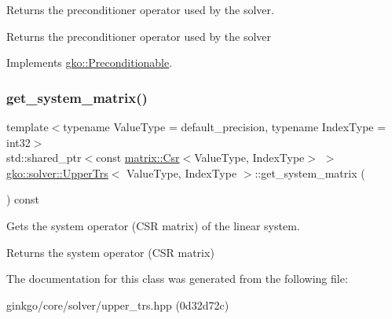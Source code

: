 Returns the preconditioner operator used by the solver. 

\begin{DoxyReturn}{Returns}
the preconditioner operator used by the solver 
\end{DoxyReturn}


Implements \hyperlink{classgko_1_1Preconditionable_ad9545089aef0dfc83bc7a74e5bf1d748}{gko\+::\+Preconditionable}.

\mbox{\label{classgko_1_1solver_1_1UpperTrs_a5634d236ea80f6e0ad0bb80aae965a78}} 
\subsubsection{\texorpdfstring{get\+\_\+system\+\_\+matrix()}{get\_system\_matrix()}}
{\footnotesize\ttfamily template$<$typename Value\+Type  = default\+\_\+precision, typename Index\+Type  = int32$>$ \\
std\+::shared\+\_\+ptr$<$const \hyperlink{classgko_1_1matrix_1_1Csr}{matrix\+::\+Csr}$<$Value\+Type, Index\+Type$>$ $>$ \hyperlink{classgko_1_1solver_1_1UpperTrs}{gko\+::solver\+::\+Upper\+Trs}$<$ Value\+Type, Index\+Type $>$\+::get\+\_\+system\+\_\+matrix (\begin{DoxyParamCaption}{ }\end{DoxyParamCaption}) const\hspace{0.3cm}{\ttfamily [inline]}}



Gets the system operator (C\+SR matrix) of the linear system. 

\begin{DoxyReturn}{Returns}
the system operator (C\+SR matrix) 
\end{DoxyReturn}


The documentation for this class was generated from the following file\+:\begin{DoxyCompactItemize}
\item 
ginkgo/core/solver/upper\+\_\+trs.\+hpp (0d32d72c)\end{DoxyCompactItemize}
